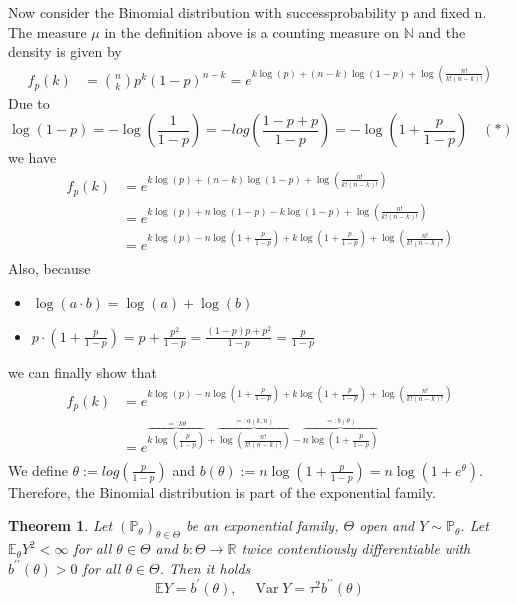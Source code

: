 \documentclass[a4paper,oneside,bibliography=totoc]{scrartcl}
\newtheorem{Satz}{Theorem}[section]
\begin{document}
Now consider the Binomial distribution with successprobability p and fixed n. The measure $\mu$ in the definition above is a counting measure on $\mathbb{N}$ and the density is given by
\begin{align*}
    f_p(k) &={n \choose k} p^k(1-p)^{n-k} = e^{k\log(p)+(n-k)\log(1-p)+\log(\frac{n!}{k!(n-k)!})}
\end{align*}
Due to
$$
\log(1-p)=-\log(\frac{1}{1-p})=-log(\frac{1-p+p}{1-p})=-\log(1+\frac{p}{1-p}) \quad (*)
$$
we have 
\begin{align*}
    f_p(k) &= e^{k\log(p)+(n-k)\log(1-p)+\log(\frac{n!}{k!(n-k)!})}\\
    &=e^{k\log(p)+n\log(1-p)-k\log(1-p)+\log(\frac{n!}{k!(n-k)!})}\\
    &=e^{k\log(p)-n\log(1+\frac{p}{1-p})+k\log(1+\frac{p}{1-p})+\log(\frac{n!}{k!(n-k)!})}\\
\end{align*}
Also, because 
\begin{itemize}
    \item {} $\log(a\cdot b)=\log(a)+\log(b)$
    \item $p\cdot(1+\frac{p}{1-p})=p+\frac{p^{2}}{1-p}=\frac{(1-p)p+p^{2}}{1-p}=\frac{p}{1-p}$
\end{itemize}
we can finally show that
\begin{align*}
    f_p(k) &= e^{k\log(p)-n\log(1+\frac{p}{1-p})+k\log(1+\frac{p}{1-p})+\log(\frac{n!}{k!(n-k)!})}\\
    &=e^{\overbrace{k\log(\frac{p}{1-p})}^{=:k\theta}+\overbrace{\log(\frac{n!}{k!(n-k)!})}^{=:a(k,n)}-\overbrace{n\log(1+\frac{p}{1-p})}^{=:b(\theta)}}\\
\end{align*}
We define $\theta:=log(\frac{p}{1-p})$ and 
$b(\theta):=n\log(1+\frac{p}{1-p})=n\log(1+e^{\theta})$.\\
Therefore, the Binomial distribution is part of the exponential family.

\begin{Satz}
    Let $\left(\mathbb{P}_\theta\right)_{\theta \in \Theta}$ be an exponential family, $\Theta$ open and $Y \sim \mathbb{P}_\theta$. Let $\mathbb{E}_\theta Y^2<\infty$ for all $\theta \in \Theta$ and $b: \Theta \rightarrow \mathbb{R}$ twice contentiously differentiable with $b^{\prime \prime}(\theta)>0$ for all $\theta \in \Theta$. Then it holds
$$
\mathbb{E} Y=b^{\prime}(\theta), \quad \operatorname{Var} Y=\tau^2 b^{\prime \prime}(\theta)
$$
\end{Satz}
\end{document}
